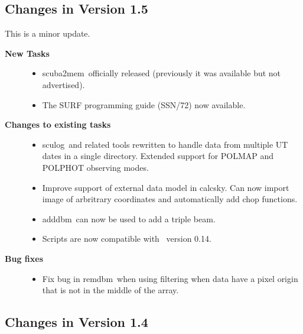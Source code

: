 \documentclass[twoside,11pt]{article}
\newcommand{\Kappa}{\xref{{\sc{Kappa}}}{sun95}{}}
\newcommand{\task}[1]{{\sf #1}}
\newcommand{\calcsky}{\htmlref{\task{calcsky}}{CALCSKY}}
\newcommand{\sculog}{\htmlref{\task{sculog}}{SCULOG}}
\newcommand{\remdbm}{\htmlref{\task{remdbm}}{REMDBM}}
\newcommand{\adddbm}{\htmlref{\task{add\_dbm}}{ADD_DBM}}
\newcommand{\scubamem}{\htmlref{\task{scuba2mem}}{SCUBA2MEM}}
\newcommand{\htmlref}[2]{#1}
\newcommand{\xref}[3]{#1}
\renewcommand{\_}{\texttt{\symbol{95}}}
\begin{document}
\subsection{Changes in Version 1.5}

This is a minor update.

\begin{description}

\item[\textbf{New Tasks}] \mbox{}

\begin{itemize}
\item \scubamem\ officially released (previously it was available but
not advertised). 

\item The SURF programming guide (\xref{SSN/72}{ssn72}{}) now available.
\end{itemize}

\item[\textbf{Changes to existing tasks}] \mbox{}

\begin{itemize}
\item \sculog\ and related tools rewritten to handle data from
multiple UT dates in a single directory. Extended support for POLMAP
and POLPHOT observing modes.

\item Improve support of external data model in \calcsky. Can now
import image of arbritrary coordinates and automatically add chop functions.

\item \adddbm\ can now be used to add a triple beam.

\item Scripts are now compatible with \Kappa\ version 0.14.


\end{itemize}

\item[\textbf{Bug fixes}] \mbox{}

\begin{itemize}
\item Fix bug in \remdbm\ when using filtering when data have a pixel
origin that is not in the middle of the array.
\end{itemize}

\end{description}

\subsection{Changes in Version 1.4}
\end{document}
